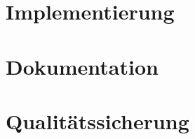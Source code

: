 \documentclass{scrartcl}
\begin{document}
\clearpage
\section{Implementierung}


\clearpage


\clearpage
\section{Dokumentation}


\clearpage
\section{Qualitätssicherung}

\end{document}

